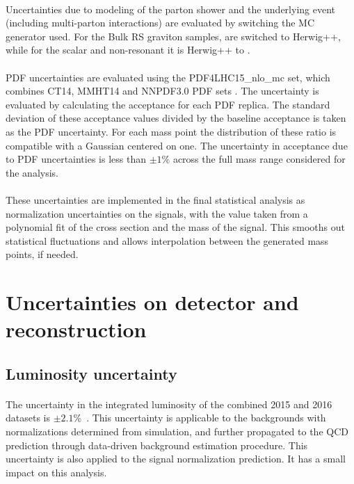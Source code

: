 \paragraph{}
Uncertainties due to modeling of the parton shower and the underlying event (including multi-parton interactions) are evaluated by switching the MC generator used. For the Bulk RS graviton samples,  are switched to Herwig++, while for the scalar and non-resonant it is Herwig++ to .

\paragraph{}
PDF uncertainties are evaluated using the PDF4LHC15\_nlo\_mc set, which combines CT14, MMHT14 and NNPDF3.0 PDF sets \cite{0954-3899-43-2-023001}. 
The uncertainty is evaluated by calculating the acceptance for each PDF replica. 
The standard deviation of these acceptance values divided by the baseline acceptance is taken as the PDF uncertainty. 
For each mass point the distribution of these ratio is compatible with a Gaussian centered on one.
The uncertainty in acceptance due to PDF uncertainties is less than $\pm1\%$ across the full mass range considered for the analysis.

\paragraph{}
These uncertainties are implemented in the final statistical analysis as normalization uncertainties on the signals, with the value taken from a polynomial fit of the cross section and the mass of the signal.
This smooths out statistical fluctuations and allows interpolation between the generated mass points, if needed.


\section{Uncertainties on detector and reconstruction}

\subsection{Luminosity uncertainty} 
\paragraph{}
The uncertainty in the integrated luminosity of the combined 2015 and 2016 datasets is $\pm2.1$\%~\cite{LumiCiteUP}.
This uncertainty is applicable to the backgrounds with normalizations determined from simulation, and further propagated to the QCD prediction through data-driven background estimation procedure.
This uncertainty is also applied to the signal normalization prediction.
It has a small impact on this analysis. 

